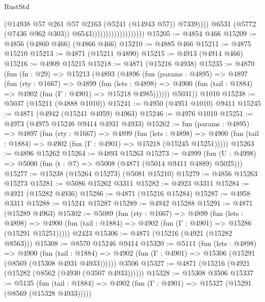 \begin{lexlean}{RustStd}
\begin{coremodule}
                                                (@14938
                                                  @57
                                                  @261
                                                  @57
                                                  @2163
                                                  (@5241 (@14943 @57))
                                                  @7339))))
                                          @6531
                                          (@5772 (@7436 @962 @303))
                                          @6543)))))))))))))))))))
@15205 := @4854 @466
@15209 := @4856 (@4860 @466) (@4866 @466)
@15210 := @4885 @466
@15211 := @4875 @15210
@15213 := @4871 (@15211 @4890)
@15215 := @4913 (@4914 @466)
@15216 := @4909 @15215
@15218 := @4871 (@15216 @4938)
@15235 := @4870
    (fun (fn : @29) =>
    @15213
      (@4893
        (@4896
          (fun (params : @4895) =>
          @4897
            (fun (rty : @1667) =>
            @4899
              (fun (lets : @4898) =>
              @4900 (fun (tail : @1884) => @4902 (fun (Γ : @4901) => @15218 @4985))))))
        @5031))
    @1010
@15238 := @5037 (@15211 (@4888 @1010))
@15241 := @4950 (@4951 @1010) @9411
@15245 := @4871 (@4942 (@15241 @4959) @4963)
@15246 := @4976 @1010
@15251 := @4973 (@4975 @15246 @9414 @4931 @4933)
@15262 := fun (params : @4895) =>
  @4897
    (fun (rty : @1667) =>
    @4899
      (fun (lets : @4898) =>
      @4900 (fun (tail : @1884) => @4902 (fun (Γ : @4901) => @15218 (@15245 @15251)))))
@15263 := @4896 @15262
@15264 := @4893 @15263
@15273 := @4999 (fun (U : @4998) => @5000 (fun (t : @7) => @5008 (@4871 (@5014 @9411 @4889) @5025)))
@15277 := @15238 (@15264 @15273) (@5081 @15210)
@15279 := @4856 @15263 @15273
@15281 := @5086 @15262 @3311
@15282 := @4923 @3311
@15284 := @4921 (@15282 @4936)
@15286 := @4871 (@15216 @15284)
@15287 := @4958 @3311
@15288 := @15241 @15287
@15289 := @4942 @15288
@15291 := @4871 (@15289 @4963)
@15302 := @5089
    (fun (rty : @1667) =>
    @4899
      (fun (lets : @4898) =>
      @4900 (fun (tail : @1884) => @4902 (fun (Γ : @4901) => @15286 (@15291 @15251)))))
    @2423
@15306 := @4871 (@15216 (@4921 (@15282 @8563)))
@15308 := @8570 @15246 @9414
@15320 := @5111
    (fun (lets : @4898) =>
    @4900
      (fun (tail : @1884) =>
      @4902 (fun (Γ : @4901) => @15306 (@15291 (@8569 (@15308 @4931 @4933))))))
    @3506
@15327 := @4871 (@15216 (@4921 (@15282 (@8562 (@4930 (@3507 @4933))))))
@15328 := @15308 @3506
@15337 := @5135
    (fun (tail : @1884) => @4902 (fun (Γ : @4901) => @15327 (@15291 (@8569 (@15328 @4933)))))

\end{coremodule}
\end{lexlean}
